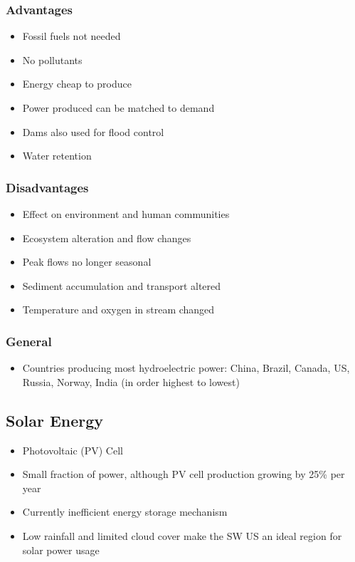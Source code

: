 \documentclass[11pt]{article}
\begin{document}
\subsubsection{Advantages}
\label{sec:orgb467bb8}
\begin{itemize}
\item Fossil fuels not needed
\item No pollutants
\item Energy cheap to produce
\item Power produced can be matched to demand
\item Dams also used for flood control
\item Water retention
\end{itemize}
\subsubsection{Disadvantages}
\label{sec:org253fcd4}
\begin{itemize}
\item Effect on environment and human communities
\item Ecosystem alteration and flow changes
\item Peak flows no longer seasonal
\item Sediment accumulation and transport altered
\item Temperature and oxygen in stream changed
\end{itemize}
\subsubsection{General}
\label{sec:orgaf7fa0d}
\begin{itemize}
\item Countries producing most hydroelectric power: China, Brazil, Canada, US, Russia, Norway, India (in order highest to lowest)
\end{itemize}
\subsection{Solar Energy}
\label{sec:org8747f81}
\begin{itemize}
\item Photovoltaic (PV) Cell
\item Small fraction of power, although PV cell production growing by 25\% per year
\item Currently inefficient energy storage mechanism
\item Low rainfall and limited cloud cover make the SW US an ideal region for solar power usage
\end{itemize}
\end{document}
